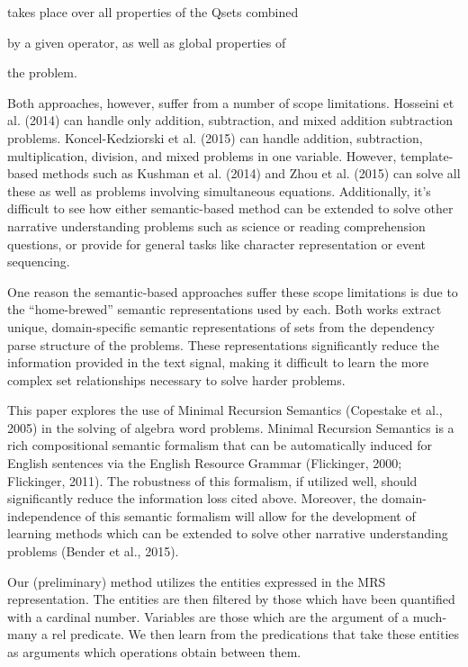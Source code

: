 takes place over all properties of the Qsets combined

by a given operator, as well as global properties of

the problem.


Both approaches, however, suffer from a number of scope limitations. Hosseini et al. (2014) can handle only addition, subtraction, and mixed addition subtraction problems. Koncel-Kedziorski et al. (2015) can handle addition, subtraction, multiplication, division, and mixed problems in one variable. However, template-based methods such as Kushman et al. (2014) and Zhou et al. (2015) can solve all these as well as problems involving simultaneous equations. Additionally, it’s difficult to see how either semantic-based method can be extended to solve other narrative understanding problems such as science or reading comprehension questions, or provide for general tasks like character representation or event sequencing.

One reason the semantic-based approaches suffer these scope limitations is due to the “home-brewed” semantic representations used by each. Both works extract unique, domain-specific semantic representations of sets from the dependency parse structure of the problems. These representations significantly reduce the information provided in the text signal, making it difficult to learn the more complex set relationships necessary to solve harder problems.

This paper explores the use of Minimal Recursion Semantics (Copestake et al., 2005) in the solving of algebra word problems. Minimal Recursion Semantics is a rich compositional semantic formalism that can be automatically induced for English sentences via the English Resource Grammar (Flickinger, 2000; Flickinger, 2011). The robustness of this formalism, if utilized well, should significantly reduce the information loss cited above.
Moreover, the domain-independence of this semantic formalism will allow for the development of learning methods which can be extended to solve other narrative understanding problems (Bender et al., 2015).

Our (preliminary) method utilizes the entities expressed in the MRS representation. The entities are then filtered by those which have been quantified with a cardinal number. Variables are those which are the argument of a much-many a rel predicate.
We then learn from the predications that take these entities as arguments which operations obtain between them. 
